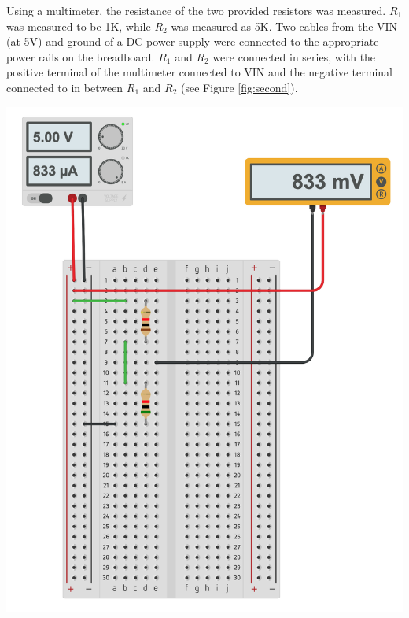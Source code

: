\documentclass[journal]{IEEEtran}
\begin{document}
\noindent Using a multimeter, the resistance of the two provided resistors was measured. $R_1$ was measured to be 1K\ohm, while $R_2$ was measured as 5K\ohm. Two cables from the VIN (at 5V) and ground of a DC power supply were connected to the appropriate power rails on the breadboard. $R_1$ and $R_2$ were connected in series, with the positive terminal of the multimeter connected to VIN and the negative terminal connected to in between $R_1$ and $R_2$ (see Figure \ref{fig:second}).

\begingroup
    \medskip
    \centering
    \includegraphics[scale=0.3]{images/lab1_2.png}
    \label{fig:second}
    \medskip
\endgroup
\end{document}
